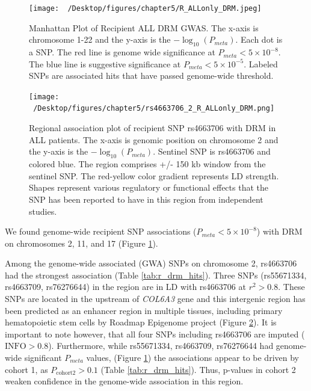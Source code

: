 \documentclass[]{DissertateOSU}
\begin{document}

\begin{figure}
    \centering
    \texttt{[image: ~/Desktop/figures/chapter5/R\_ALLonly\_DRM.jpeg]}
    \caption[Manhattan Plot of Recipient ALL DRM GWAS.]{Manhattan Plot of Recipient ALL DRM GWAS. The x-axis is chromosome 1-22 and the y-axis is the $-\log_{10}(P_{meta})$. Each dot is a SNP. The red line is genome wide significance at $P_{meta} < 5\times{10}^{-8}$. The blue line is suggestive significance at $P_{meta} <  5\times{10}^{-5}$. Labeled SNPs are associated hits that have passed genome-wide threshold.}
    \label{fig:r_drm_1y}  
\end{figure}

\begin{figure}
    \centering
    \texttt{[image: ~/Desktop/figures/chapter5/rs4663706\_2\_R\_ALLonly\_DRM.png]}
    \caption[Regional association plot of recipient SNP rs4663706 with DRM in ALL patients.]{Regional association plot of recipient SNP rs4663706 with DRM in ALL patients. The x-axis is genomic position on chromosome 2 and the y-axis is the $-\log_{10}(P_{meta})$. Sentinel SNP is rs4663706 and colored blue. The region comprises +/- 150 kb window from the sentinel SNP. The red-yellow color gradient represents LD strength. Shapes represent various regulatory or functional effects that the SNP has been reported to have in this region from independent studies.}
    \label{fig:r_drm_1y_chr2reg1}  
\end{figure}

We found genome-wide recipient SNP associations
(\(P_{meta} < 5\times{10}^{-8}\)) with DRM on chromosomes 2, 11, and 17
(Figure \ref{fig:r_drm_1y}).

Among the genome-wide associated (GWA) SNPs on chromosome 2, rs4663706
had the strongest association (Table \ref{tab:r_drm_hits}). Three SNPs
(rs55671334, rs4663709, rs76276644) in the region are in LD with
rs4663706 at \(r^2>0.8\). These SNPs are located in the upstream of
\emph{COL6A3} gene and this intergenic region has been predicted as an
enhancer region in multiple tissues, including primary hematopoietic
stem cells by Roadmap Epigenome project (Figure
\ref{fig:r_drm_1y_chr2reg1}). It is important to note however, that all
four SNPs including rs4663706 are imputed (\(\text{INFO} > 0.8\)).
Furthermore, while rs55671334, rs4663709, rs76276644 had genome-wide
significant \(P_{meta}\) values, (Figure \ref{fig:r_drm_1y}) the
associations appear to be driven by cohort 1, as
\(P_{\text{cohort2}} > 0.1\) (Table \ref{tab:r_drm_hits}). Thus,
p-values in cohort 2 weaken confidence in the genome-wide association in
this region.
\end{document}
